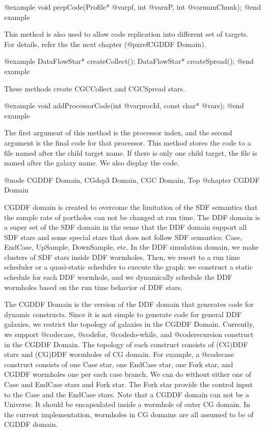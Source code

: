 {@example
void prepCode(Profile* @var{pf}, int @var{nP}, int @var{numChunk});
@end example

This method is also used to allow code replication into different set of
targets. For details, refer the the next chapter (@pxref{CGDDF Domain}).

@example
DataFlowStar* createCollect();
DataFlowStar* createSpread();
@end example

These methods create CGCCollect and CGCSpread stars.

@example
void addProcessorCode(int @var{procId}, const char* @var{s});
@end example

The first argument of this method is the processor index, and the second
argument is the final code for that processor. This method stores the
code to a file named after the child target name. If there is only one
child target, the file is named after the galaxy name.
We also display the code.

@node CGDDF Domain, CGdsp3 Domain, CGC Domain, Top
@chapter CGDDF Domain

CGDDF domain is created to overcome the limitation of the SDF semantics
that the sample rate of portholes can not be changed at run time. The
DDF domain is a super set of the SDF domain in the sense that the DDF
domain support all SDF stars and some special stars that does not
follow SDF semantics: Case, EndCase, UpSample, DownSample, etc. In the
DDF simulation domain, we make clusters of SDF stars inside DDF wormholes.
Then, we resort to a run time scheduler or a quasi-static scheduler to
execute the graph: we construct a static schedule for each DDF wormhole,
and we dynamically schedule the DDF wormholes based on the run time behavior
of DDF stars.

The CGDDF Domain is the version of the DDF domain that generates code 
for dynamic constructs. Since it is not simple to generate code for 
general DDF galaxies,
we restrict the topology of galaxies in the CGDDF Domain. Currently,
we support @code{case}, @code{for}, @code{do-while}, and @code{recursion}
construct in the CGDDF Domain. The topology of each construct consists of
(CG)DDF stars and (CG)DDF wormholes of CG domain. For example,
a @code{case} construct consists of one Case star, one EndCase star,
one Fork star, and CGDDF wormholes one per each case branch. We can do
without either one of Case and EndCase stars and Fork star. The Fork star
provide the control input to the Case and the EndCase stars. Note that
a CGDDF domain can not be a Universe. It should be encapsulated inside
a wormhole of outer CG domain. In the current implementation, wormholes in
CG domains are all assumed to be of CGDDF domain.

}

